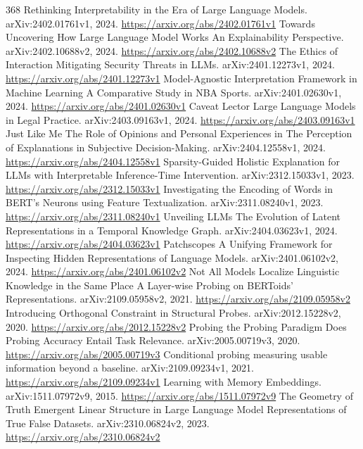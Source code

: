 \documentclass[11pt]{article}
\begin{document}
\begin{thebibliography}{368}
 Rethinking Interpretability in the Era of Large Language Models. arXiv:2402.01761v1, 2024. \url{https://arxiv.org/abs/2402.01761v1}
 Towards Uncovering How Large Language Model Works An Explainability Perspective. arXiv:2402.10688v2, 2024. \url{https://arxiv.org/abs/2402.10688v2}
 The Ethics of Interaction Mitigating Security Threats in LLMs. arXiv:2401.12273v1, 2024. \url{https://arxiv.org/abs/2401.12273v1}
 Model-Agnostic Interpretation Framework in Machine Learning A Comparative Study in NBA Sports. arXiv:2401.02630v1, 2024. \url{https://arxiv.org/abs/2401.02630v1}
 Caveat Lector Large Language Models in Legal Practice. arXiv:2403.09163v1, 2024. \url{https://arxiv.org/abs/2403.09163v1}
 Just Like Me The Role of Opinions and Personal Experiences in The Perception of Explanations in Subjective Decision-Making. arXiv:2404.12558v1, 2024. \url{https://arxiv.org/abs/2404.12558v1}
 Sparsity-Guided Holistic Explanation for LLMs with Interpretable Inference-Time Intervention. arXiv:2312.15033v1, 2023. \url{https://arxiv.org/abs/2312.15033v1}
 Investigating the Encoding of Words in BERT's Neurons using Feature Textualization. arXiv:2311.08240v1, 2023. \url{https://arxiv.org/abs/2311.08240v1}
 Unveiling LLMs The Evolution of Latent Representations in a Temporal Knowledge Graph. arXiv:2404.03623v1, 2024. \url{https://arxiv.org/abs/2404.03623v1}
 Patchscopes A Unifying Framework for Inspecting Hidden Representations of Language Models. arXiv:2401.06102v2, 2024. \url{https://arxiv.org/abs/2401.06102v2}
 Not All Models Localize Linguistic Knowledge in the Same Place A Layer-wise Probing on BERToids' Representations. arXiv:2109.05958v2, 2021. \url{https://arxiv.org/abs/2109.05958v2}
 Introducing Orthogonal Constraint in Structural Probes. arXiv:2012.15228v2, 2020. \url{https://arxiv.org/abs/2012.15228v2}
 Probing the Probing Paradigm Does Probing Accuracy Entail Task Relevance. arXiv:2005.00719v3, 2020. \url{https://arxiv.org/abs/2005.00719v3}
 Conditional probing measuring usable information beyond a baseline. arXiv:2109.09234v1, 2021. \url{https://arxiv.org/abs/2109.09234v1}
 Learning with Memory Embeddings. arXiv:1511.07972v9, 2015. \url{https://arxiv.org/abs/1511.07972v9}
 The Geometry of Truth Emergent Linear Structure in Large Language Model Representations of True False Datasets. arXiv:2310.06824v2, 2023. \url{https://arxiv.org/abs/2310.06824v2}

\end{thebibliography}
\end{document}
